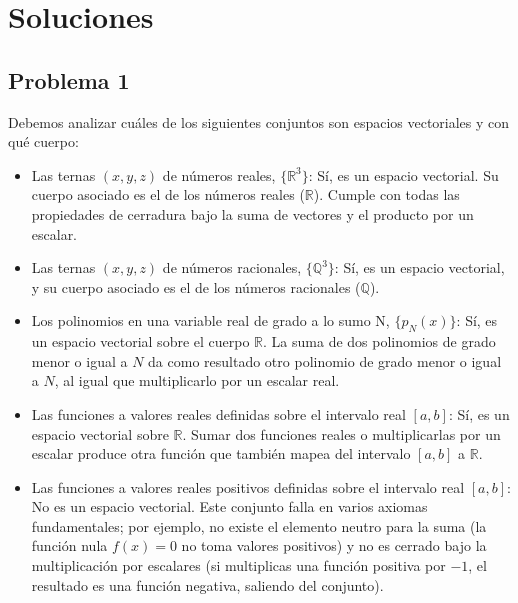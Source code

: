 \documentclass[11pt,spanish]{article}
\begin{document}
\section*{Soluciones}


\subsection*{Problema 1}

Debemos analizar cuáles de los siguientes conjuntos son espacios vectoriales y con qué cuerpo:

\begin{itemize}
\item[a)] Las ternas $(x, y, z)$ de números reales, $\{\mathbb{R}^{3}\}$:
Sí, es un espacio vectorial. Su cuerpo asociado es el de los números reales ($\mathbb{R}$). Cumple con todas las propiedades de cerradura bajo la suma de vectores y el producto por un escalar.

\item[b)] Las ternas $(x, y, z)$ de números racionales, $\{\mathbb{Q}^{3}\}$:
Sí, es un espacio vectorial, y su cuerpo asociado es el de los números racionales ($\mathbb{Q}$).

\item[c)] Los polinomios en una variable real de grado a lo sumo N, $\{p_{N}(x)\}$:
Sí, es un espacio vectorial sobre el cuerpo $\mathbb{R}$. La suma de dos polinomios de grado menor o igual a $N$ da como resultado otro polinomio de grado menor o igual a $N$, al igual que multiplicarlo por un escalar real.

\item[d)] Las funciones a valores reales definidas sobre el intervalo real $[a, b]$:
Sí, es un espacio vectorial sobre $\mathbb{R}$. Sumar dos funciones reales o multiplicarlas por un escalar produce otra función que también mapea del intervalo $[a, b]$ a $\mathbb{R}$.

\item[e)] Las funciones a valores reales positivos definidas sobre el intervalo real $[a, b]$:
No es un espacio vectorial. Este conjunto falla en varios axiomas fundamentales; por ejemplo, no existe el elemento neutro para la suma (la función nula $f(x) = 0$ no toma valores positivos) y no es cerrado bajo la multiplicación por escalares (si multiplicas una función positiva por $-1$, el resultado es una función negativa, saliendo del conjunto).

\end{itemize}
\end{document}
